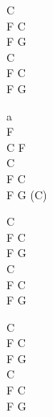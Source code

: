 \begin{chord}
    C\\
    F C\\
    F G\\
    C\\
    F C\\
    F G

    a\\
    F\\
    C F\\
    C\\
    F C\\
    F G (C)

    C\\
    F C\\
    F G\\
    C\\
    F C\\
    F G

    C\\
    F C\\
    F G\\
    C\\
    F C\\
    F G
\end{chord}